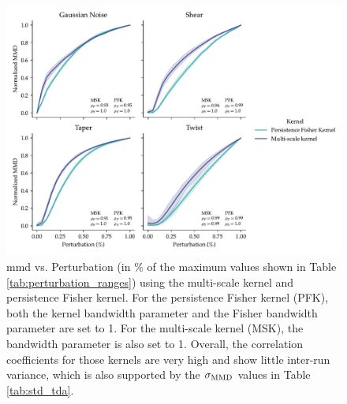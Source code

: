 \begin{figure}
  \centering
  \includegraphics[width=\textwidth]{./figures/results/res_6.pdf}
  \caption[\acrshort{mmd} using topological kernels.]{\acrshort{mmd} vs.
Perturbation (in \% of the maximum values shown in Table
\ref{tab:perturbation_ranges}) using the multi-scale kernel and persistence
Fisher kernel. For the persistence Fisher kernel (PFK), both the kernel
bandwidth parameter and the Fisher bandwidth parameter are set to 1. For the
multi-scale kernel (MSK), the bandwidth parameter is also set to 1. Overall, the
correlation coefficients for those kernels are very high and show little
inter-run variance, which is also supported by the $\sigma_\MMD$ values in Table
\ref{tab:std_tda}.}
  \label{fig:tda_kernels}
\end{figure}

\begin{table}
  \centering
  \caption[$\sigma_\MMD$ values for the MMD using the persitence Fisher kernel
  and the multi scale kernel]{$\sigma_\MMD$ values for the MMD using the persitence Fisher kernel (PSK)
    and the multi scale kernel (MSK).}
  \label{tab:std_tda}
\end{table}

